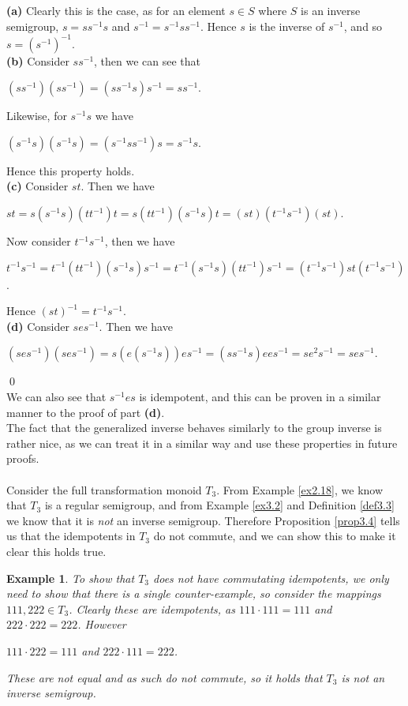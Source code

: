 \documentclass[12pt]{article}
\newtheorem{ex}[theorem]{Example}
\begin{document}
\proof
	\textbf{(a)} Clearly this is the case, as for an element $s \in S$ where $S$ is an inverse semigroup, $s=ss^{-1}s$ and $s^{-1}=s^{-1}ss^{-1}$. Hence $s$ is the inverse of $s^{-1}$, and so $s = (s^{-1})^{-1}$.\\
	\textbf{(b)} Consider $ss^{-1}$, then we can see that
	\begin{center}
		$(ss^{-1})(ss^{-1})=(ss^{-1}s)s^{-1}=ss^{-1}$.
	\end{center}
	Likewise, for $s^{-1}s$ we have
	\begin{center}
		$(s^{-1}s)(s^{-1}s)=(s^{-1}ss^{-1})s=s^{-1}s$.
	\end{center}
	Hence this property holds.\\
	\textbf{(c)} Consider $st$. Then we have
	\begin{center}
		$st = s(s^{-1}s)(tt^{-1})t=s(tt^{-1})(s^{-1}s)t=(st)(t^{-1}s^{-1})(st)$.
	\end{center}
	Now consider $t^{-1}s^{-1}$, then we have
	\begin{center}
		$t^{-1}s^{-1}=t^{-1}(tt^{-1})(s^{-1}s)s^{-1}=t^{-1}(s^{-1}s)(tt^{-1})s^{-1}=(t^{-1}s^{-1})st(t^{-1}s^{-1})$.
	\end{center}
	Hence $(st)^{-1} = t^{-1}s^{-1}$.\\
	\textbf{(d)} Consider $ses^{-1}$. Then we have
	\begin{center}
		$(ses^{-1})(ses^{-1})=s(e(s^{-1}s))es^{-1}=(ss^{-1}s)ees^{-1}=se^2s^{-1}=ses^{-1}$.
	\end{center}
	\qed\\
We can also see that $s^{-1}es$ is idempotent, and this can be proven in a similar manner to the proof of part \textbf{(d)}.\\
The fact that the generalized inverse behaves similarly to the group inverse is rather nice, as we can treat it in a similar way and use these properties in future proofs.\\
\\Consider the full transformation monoid $T_3$. From Example \ref{ex2.18}, we know that $T_3$ is a regular semigroup, and from Example \ref{ex3.2} and Definition \ref{def3.3} we know that it is \textit{not} an inverse semigroup. Therefore Proposition \ref{prop3.4} tells us that the idempotents in $T_3$ do not commute, and we can show this to make it clear this holds true.
\begin{ex}
	To show that $T_3$ does not have commutating idempotents, we only need to show that there is a single counter-example, so consider the mappings $111,222 \in T_3$. Clearly these are idempotents, as $111 \cdot 111 = 111$ and $222 \cdot 222 = 222$. However
	\begin{center}
		$111 \cdot 222 = 111$ \quad	and \quad	$222 \cdot 111 = 222$.
	\end{center}
	These are not equal and as such do not commute, so it holds that $T_3$ is not an inverse semigroup.
\end{ex}
\end{document}
